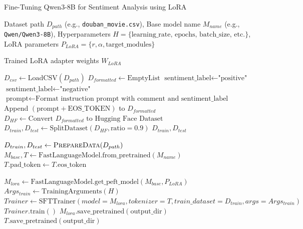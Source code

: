 \documentclass{article}
\begin{document}
\begin{algorithm}[H]
\caption{Fine-Tuning Qwen3-8B for Sentiment Analysis using LoRA}
\label{alg:fine_tuning}
\begin{algorithmic}[1]
\Require 
    Dataset path $D_{path}$ (e.g., \texttt{douban\_movie.csv}),
    Base model name $M_{name}$ (e.g., \texttt{Qwen/Qwen3-8B}),
    Hyperparameters $H = \{ \text{learning\_rate, epochs, batch\_size, etc.} \}$,
    LoRA parameters $P_{LoRA} = \{ r, \alpha, \text{target\_modules} \}$

\Ensure 
    Trained LoRA adapter weights $W_{LoRA}$

\Statex
{}
    \State $D_{csv} \gets \text{LoadCSV}(D_{path})$
    \State $D_{formatted} \gets \text{EmptyList}$
            \State $\text{sentiment\_label} \gets \text{"positive"}$
        \Else
            \State $\text{sentiment\_label} \gets \text{"negative"}$
        \EndIf
        \State $\text{prompt} \gets \text{Format instruction prompt with comment and sentiment\_label}$
        \State Append $(\text{prompt} + \text{EOS\_TOKEN})$ to $D_{formatted}$
    \EndFor
    \State $D_{HF} \gets \text{Convert } D_{formatted} \text{ to Hugging Face Dataset}$
    \State $D_{train}, D_{test} \gets \text{SplitDataset}(D_{HF}, \text{ratio}=0.9)$
    \State \Return $D_{train}, D_{test}$
\EndFunction

\Statex
\State $D_{train}, D_{test} \gets \text{\textsc{PrepareData}}(D_{path})$
\State $M_{base}, T \gets \text{FastLanguageModel.from\_pretrained}(M_{name})$ 
\State {}
    \State $T.\text{pad\_token} \gets T.\text{eos\_token}$
\EndIf

\State $M_{lora} \gets \text{FastLanguageModel.get\_peft\_model}(M_{base}, P_{LoRA})$ 
\State $Args_{train} \gets \text{TrainingArguments}(H)$ 
\State $Trainer \gets \text{SFTTrainer}(model=M_{lora}, tokenizer=T, train\_dataset=D_{train}, args=Args_{train})$
\State $Trainer.\text{train}()$ 
\State $M_{lora}.\text{save\_pretrained}(\text{output\_dir})$ 
\State $T.\text{save\_pretrained}(\text{output\_dir})$
\end{algorithmic}
\end{algorithm}
\end{document}
